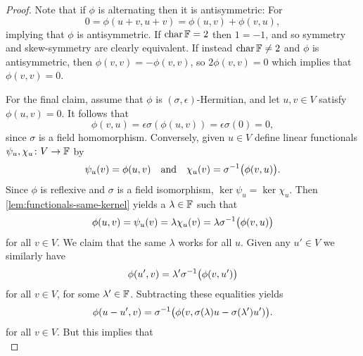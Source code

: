 \begin{proof}
    Note that if $\phi$ is alternating then it is antisymmetric: For
    \begin{equation*}
        0
            = \phi(u + v, u + v)
            = \phi(u,v) + \phi(v,u),
    \end{equation*}
    implying that $\phi$ is antisymmetric. If $\operatorname{char} \mathbb{F} = 2$ then $1 = -1$, and so symmetry and skew-symmetry are clearly equivalent. If instead $\operatorname{char} \mathbb{F} \neq 2$ and $\phi$ is antisymmetric, then $\phi(v,v) = -\phi(v,v)$, so $2\phi(v,v) = 0$ which implies that $\phi(v,v) = 0$.

    For the final claim, assume that $\phi$ is $(\sigma,\epsilon)$-Hermitian, and let $u,v \in V$ satisfy $\phi(u,v) = 0$. It follows that
    \begin{equation*}
        \phi(v,u)
            = \epsilon \sigma(\phi(u,v))
            = \epsilon \sigma(0)
            = 0,
    \end{equation*}
    since $\sigma$ is a field homomorphism. Conversely, given $u \in V$ define linear functionals $\psi_u,\chi_u \colon V \to \mathbb{F}$ by
    \begin{equation*}
        \psi_u(v) = \phi(u,v)
        \quad \text{and} \quad
        \chi_u(v) = \inv{\sigma}\big( \phi(v,u) \big).
    \end{equation*}
    Since $\phi$ is reflexive and $\sigma$ is a field isomorphism, $\ker \psi_u = \ker \chi_u$. Then \cref{lem:functionals-same-kernel} yields a $\lambda \in \mathbb{F}$ such that
    \begin{equation*}
        \phi(u,v)
            = \psi_u(v)
            = \lambda \chi_u(v)
            = \lambda \inv{\sigma}\big( \phi(v,u) \big)
    \end{equation*}
    for all $v \in V$. We claim that the same $\lambda$ works for all $u$. Given any $u' \in V$ we similarly have
    \begin{equation*}
        \phi(u',v)
            = \lambda' \inv{\sigma}\big( \phi(v,u') \big)
    \end{equation*}
    for all $v \in V$, for some $\lambda' \in \mathbb{F}$. Subtracting these equalities yields
    \begin{equation*}
        \phi(u - u',v)
            = \inv{\sigma}\big( \phi(v, \sigma(\lambda)u - \sigma(\lambda')u') \big).
    \end{equation*}
    for all $v \in V$. But this implies that
    \begin{equation*}

\end{equation*}
\end{proof}
